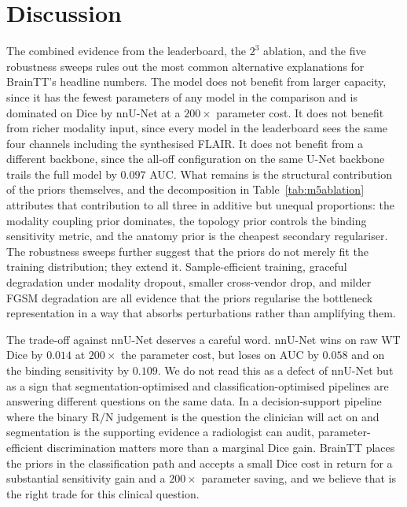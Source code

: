 \documentclass[11pt,a4paper]{article}
\begin{document}
\section{Discussion}\label{sec:discuss}

The combined evidence from the leaderboard, the $2^3$ ablation, and the five robustness sweeps rules out the most common alternative explanations for BrainTT's headline numbers. The model does not benefit from larger capacity, since it has the fewest parameters of any model in the comparison and is dominated on Dice by nnU-Net at a $200\times$ parameter cost. It does not benefit from richer modality input, since every model in the leaderboard sees the same four channels including the synthesised FLAIR. It does not benefit from a different backbone, since the all-off configuration on the same U-Net backbone trails the full model by $0.097$ AUC. What remains is the structural contribution of the priors themselves, and the decomposition in Table~\ref{tab:m5ablation} attributes that contribution to all three in additive but unequal proportions: the modality coupling prior dominates, the topology prior controls the binding sensitivity metric, and the anatomy prior is the cheapest secondary regulariser. The robustness sweeps further suggest that the priors do not merely fit the training distribution; they extend it. Sample-efficient training, graceful degradation under modality dropout, smaller cross-vendor drop, and milder FGSM degradation are all evidence that the priors regularise the bottleneck representation in a way that absorbs perturbations rather than amplifying them.

The trade-off against nnU-Net deserves a careful word. nnU-Net wins on raw WT Dice by $0.014$ at $200\times$ the parameter cost, but loses on AUC by $0.058$ and on the binding sensitivity by $0.109$. We do not read this as a defect of nnU-Net but as a sign that segmentation-optimised and classification-optimised pipelines are answering different questions on the same data. In a decision-support pipeline where the binary R/N judgement is the question the clinician will act on and segmentation is the supporting evidence a radiologist can audit, parameter-efficient discrimination matters more than a marginal Dice gain. BrainTT places the priors in the classification path and accepts a small Dice cost in return for a substantial sensitivity gain and a $200\times$ parameter saving, and we believe that is the right trade for this clinical question.
\end{document}
